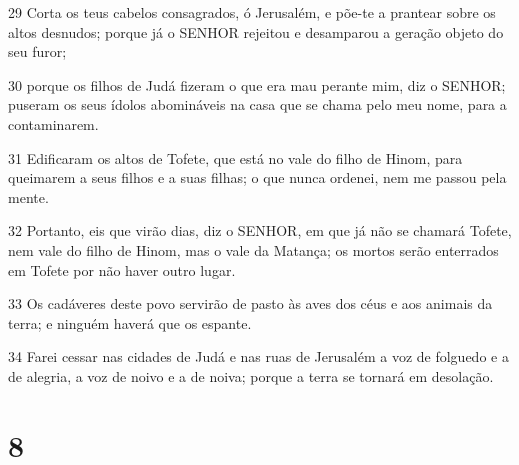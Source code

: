 \par 29 Corta os teus cabelos consagrados, ó Jerusalém, e põe-te a prantear sobre os altos desnudos; porque já o SENHOR rejeitou e desamparou a geração objeto do seu furor;
\par 30 porque os filhos de Judá fizeram o que era mau perante mim, diz o SENHOR; puseram os seus ídolos abomináveis na casa que se chama pelo meu nome, para a contaminarem.
\par 31 Edificaram os altos de Tofete, que está no vale do filho de Hinom, para queimarem a seus filhos e a suas filhas; o que nunca ordenei, nem me passou pela mente.
\par 32 Portanto, eis que virão dias, diz o SENHOR, em que já não se chamará Tofete, nem vale do filho de Hinom, mas o vale da Matança; os mortos serão enterrados em Tofete por não haver outro lugar.
\par 33 Os cadáveres deste povo servirão de pasto às aves dos céus e aos animais da terra; e ninguém haverá que os espante.
\par 34 Farei cessar nas cidades de Judá e nas ruas de Jerusalém a voz de folguedo e a de alegria, a voz de noivo e a de noiva; porque a terra se tornará em desolação.

\chapter{8}

